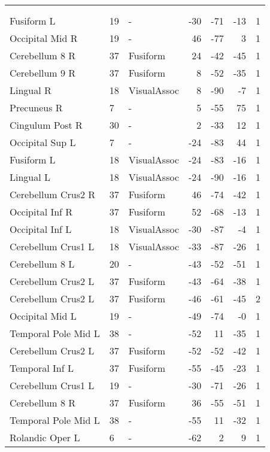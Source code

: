 \begin{table}
    \small
    \centering
    \begin{ThreePartTable}
    \begin{tabularx}{\textwidth}{A{4cm} l L *{3}{r} *{1}{R}}
     \\
    \toprule
     &  &  &  &  &  & \\
    \toprule
{} \\
\midrule
    Fusiform L & 19 & - & -30 & -71 & -13 & 1 \\
Occipital Mid R & 19 & - & 46 & -77 & 3 & 1 \\
Cerebellum 8 R & 37 & Fusiform & 24 & -42 & -45 & 1 \\
Cerebellum 9 R & 37 & Fusiform & 8 & -52 & -35 & 1 \\
Lingual R & 18 & VisualAssoc & 8 & -90 & -7 & 1 \\
Precuneus R & 7 & - & 5 & -55 & 75 & 1 \\
Cingulum Post R & 30 & - & 2 & -33 & 12 & 1 \\
Occipital Sup L & 7 & - & -24 & -83 & 44 & 1 \\
Fusiform L & 18 & VisualAssoc & -24 & -83 & -16 & 1 \\
Lingual L & 18 & VisualAssoc & -24 & -90 & -16 & 1 \\
Cerebellum Crus2 R & 37 & Fusiform & 46 & -74 & -42 & 1 \\
Occipital Inf R & 37 & Fusiform & 52 & -68 & -13 & 1 \\
Occipital Inf L & 18 & VisualAssoc & -30 & -87 & -4 & 1 \\
Cerebellum Crus1 L & 18 & VisualAssoc & -33 & -87 & -26 & 1 \\
Cerebellum 8 L & 20 & - & -43 & -52 & -51 & 1 \\
Cerebellum Crus2 L & 37 & Fusiform & -43 & -64 & -38 & 1 \\
Cerebellum Crus2 L & 37 & Fusiform & -46 & -61 & -45 & 2 \\
Occipital Mid L & 19 & - & -49 & -74 & -0 & 1 \\
Temporal Pole Mid L & 38 & - & -52 & 11 & -35 & 1 \\
Cerebellum Crus2 L & 37 & Fusiform & -52 & -52 & -42 & 1 \\
Temporal Inf L & 37 & Fusiform & -55 & -45 & -23 & 1 \\
Cerebellum Crus1 L & 19 & - & -30 & -71 & -26 & 1 \\
Cerebellum 8 R & 37 & Fusiform & 36 & -55 & -51 & 1 \\
Temporal Pole Mid L & 38 & - & -55 & 11 & -32 & 1 \\
Rolandic Oper L & 6 & - & -62 & 2 & 9 & 1 \\


\end{tabularx}
\end{ThreePartTable}
\end{table}

